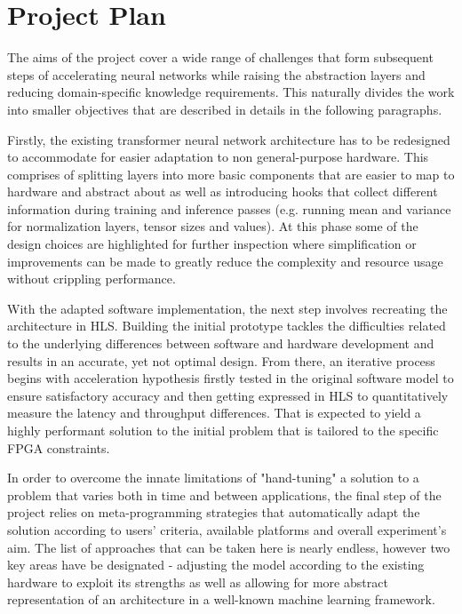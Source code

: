 \chapter{Project Plan}

The aims of the project cover a wide range of challenges that form subsequent steps of accelerating neural networks while raising the abstraction
layers and reducing domain-specific knowledge requirements. This naturally divides the work into smaller objectives that are described in details
in the following paragraphs.

Firstly, the existing transformer neural network architecture has to be redesigned to accommodate for easier adaptation to non general-purpose hardware.
This comprises of splitting layers into more basic components that are easier to map to hardware and abstract about as well as introducing hooks that
collect different information during training and inference passes (e.g. running mean and variance for normalization layers, tensor sizes and values).
At this phase some of the design choices are highlighted for further inspection where simplification or improvements can be made to greatly reduce the
complexity and resource usage without crippling performance.

With the adapted software implementation, the next step involves recreating the architecture in HLS. Building the initial prototype tackles the difficulties
related to the underlying differences between software and hardware development and results in an accurate, yet not optimal design. From there, an iterative
process begins with acceleration hypothesis firstly tested in the original software model to ensure satisfactory accuracy and then getting expressed in HLS to
quantitatively measure the latency and throughput differences. That is expected to yield a highly performant solution to the initial problem that is tailored to
the specific FPGA constraints.

In order to overcome the innate limitations of "hand-tuning" a solution to a problem that varies both in time and between applications, the final step of the
project relies on meta-programming strategies that automatically adapt the solution according to users' criteria, available platforms and overall experiment's aim.
The list of approaches that can be taken here is nearly endless, however two key areas have be designated - adjusting the model according to the existing hardware
to exploit its strengths as well as allowing for more abstract representation of an architecture in a well-known machine learning framework.

